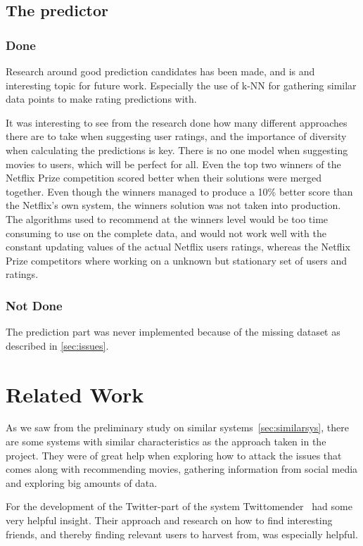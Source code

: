 \subsection{The predictor}
\subsubsection{Done}
Research around good prediction candidates has been made, and is and interesting topic for future work. Especially the use of k-NN for gathering similar data points to make rating predictions with.

It was interesting to see from the research done how many different approaches there are to take when suggesting user ratings, and the importance of diversity when calculating the predictions is key. There is no one model when suggesting movies to users, which will be perfect for all. Even the top two winners of the Netflix Prize competition scored better when their solutions were merged together. Even though the winners managed to produce a 10\% better score than the Netflix's own system, the winners solution was not taken into production. The algorithms used to recommend at the winners level would be too time consuming to use on the complete data, and would not work well with the constant updating values of the actual Netflix users ratings, whereas the Netflix Prize competitors where working on a unknown but stationary set of users and ratings.

\subsubsection{Not Done}
The prediction part was never implemented because of the missing dataset as described in \ref{sec:issues}.


\section{Related Work}
As we saw from the preliminary study on similar systems~\ref{sec:similarsys}, there are some systems with similar characteristics as the approach taken in the project. They were of great help when exploring how to attack the issues that comes along with recommending movies, gathering information from social media and exploring big amounts of data.

For the development of the Twitter-part of the system Twittomender~\cite{twittomender} had some very helpful insight. Their approach and research on how to find interesting friends, and thereby finding relevant users to harvest from, was especially helpful.

